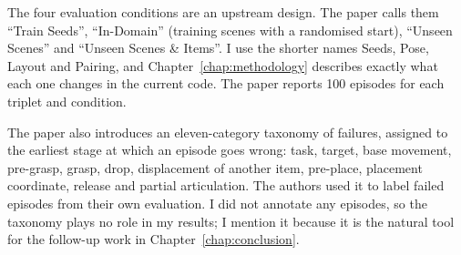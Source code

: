The four evaluation conditions are an upstream design. The paper calls them ``Train Seeds'', ``In-Domain'' (training scenes with a randomised start), ``Unseen Scenes'' and ``Unseen Scenes \& Items''. I use the shorter names Seeds, Pose, Layout and Pairing, and Chapter~\ref{chap:methodology} describes exactly what each one changes in the current code. The paper reports 100 episodes for each triplet and condition.

The paper also introduces an eleven-category taxonomy of failures, assigned to the earliest stage at which an episode goes wrong: task, target, base movement, pre-grasp, grasp, drop, displacement of another item, pre-place, placement coordinate, release and partial articulation. The authors used it to label failed episodes from their own evaluation. I did not annotate any episodes, so the taxonomy plays no role in my results; I mention it because it is the natural tool for the follow-up work in Chapter~\ref{chap:conclusion}.

\endgroup
